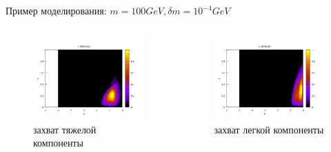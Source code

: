 Пример моделирования: $m=100GeV, \delta m = 10^{-4} GeV$
\begin{columns}[c]
	\begin{column}{0.5\textwidth} %
		\begin{figure}
				\includegraphics[width=\linewidth
				]{images/dh_100_dm.png}
				\caption{захват тяжелой компоненты}
		\end{figure}
	\end{column}
	\begin{column}{0.5\textwidth} 
		\begin{figure}
				\includegraphics[width=\linewidth]
				{images/dl_100_dm.png}
				\caption{захват легкой компоненты}
		\end{figure}
	\end{column}
\end{columns}